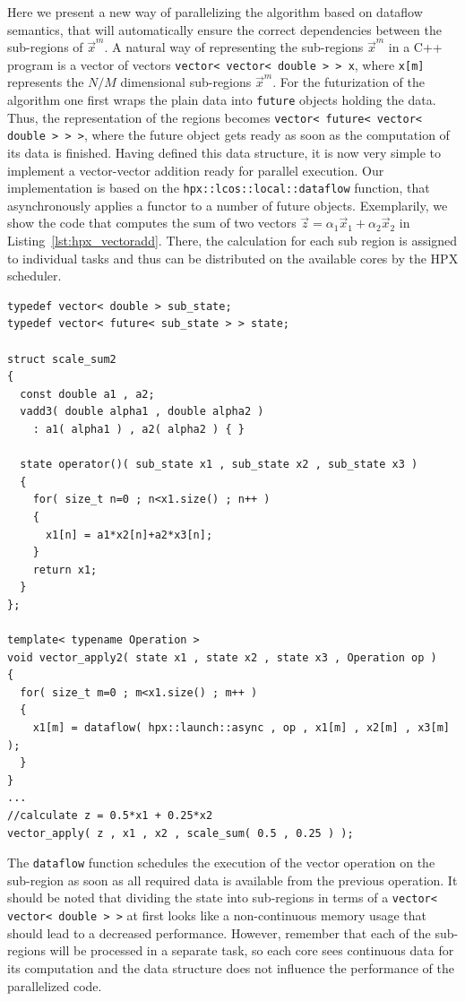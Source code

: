 \documentclass[10pt]{elsarticle}
\begin{document}
Here we present a new way of parallelizing the algorithm based on dataflow semantics, that will automatically ensure the correct dependencies between the sub-regions of $\vec x^m$.
A natural way of representing the sub-regions $\vec x^m$ in a C++ program is a vector of vectors \lstinline+vector< vector< double > > x+, where \lstinline+x[m]+ represents the $N/M$ dimensional sub-regions $\vec x^m$.
For the futurization of the algorithm one first wraps the plain data into \lstinline+future+ objects holding the data.
Thus, the representation of the regions becomes \lstinline+vector< future< vector< double > > >+, where the future object gets ready as soon as the computation of its data is finished.
Having defined this data structure, it is now very simple to implement a vector-vector addition ready for parallel execution.
Our implementation is based on the \lstinline+hpx::lcos::local::dataflow+ function, that asynchronously applies a functor to a number of future objects.
Exemplarily, we show the code that computes the sum of two vectors $\vec z = \alpha_1 \vec x_1 + \alpha_2 \vec x_2$ in Listing~\ref{lst:hpx_vectoradd}.
There, the calculation for each sub region is assigned to individual tasks and thus can be distributed on the available cores by the HPX scheduler.
\begin{lstlisting}[label=lst:hpx_vectoradd,caption=Futurized vector operation,float=t]
typedef vector< double > sub_state;
typedef vector< future< sub_state > > state;

struct scale_sum2
{
  const double a1 , a2;
  vadd3( double alpha1 , double alpha2 )
    : a1( alpha1 ) , a2( alpha2 ) { }
    
  state operator()( sub_state x1 , sub_state x2 , sub_state x3 )
  {
    for( size_t n=0 ; n<x1.size() ; n++ )
    {
      x1[n] = a1*x2[n]+a2*x3[n];
    }
    return x1;
  }
};

template< typename Operation >
void vector_apply2( state x1 , state x2 , state x3 , Operation op )
{
  for( size_t m=0 ; m<x1.size() ; m++ )
  {
    x1[m] = dataflow( hpx::launch::async , op , x1[m] , x2[m] , x3[m] );
  }
}
...
//calculate z = 0.5*x1 + 0.25*x2
vector_apply( z , x1 , x2 , scale_sum( 0.5 , 0.25 ) );
\end{lstlisting}
The \lstinline+dataflow+ function schedules the execution of the vector operation on the sub-region as soon as all required data is available from the previous operation.
It should be noted that dividing the state into sub-regions in terms of a \lstinline+vector< vector< double > >+ at first looks like a non-continuous memory usage that should lead to a decreased performance.
However, remember that each of the sub-regions will be processed in a separate task, so each core sees continuous data for its computation and the data structure does not influence the performance of the parallelized code.
\end{document}

